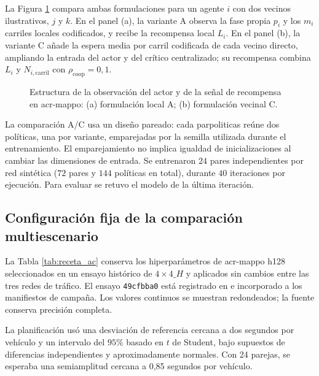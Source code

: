 La Figura \ref{fig:contraste_ac} compara ambas formulaciones para un agente $i$ con dos vecinos ilustrativos, $j$ y $k$. En el panel (a), la variante A observa la fase propia $p_i$ y los $m_i$ carriles locales codificados, y recibe la recompensa local $L_i$. En el panel (b), la variante C añade la espera media por carril codificada de cada vecino directo, ampliando la entrada del actor y del crítico centralizado; su recompensa combina $L_i$ y $N_{i,\mathrm{carril}}$ con $\rho_{\mathrm{coop}}=0{,}1$.

\begin{figure}[H]
\centering

\caption{Estructura de la observación del actor y de la señal de recompensa en \acrshort{acr-mappo}: (a) formulación local A; (b) formulación vecinal C.}
\label{fig:contraste_ac}
\end{figure}

La comparación A/C usa un diseño pareado: cada \gls{parpoliticas} reúne dos políticas, una por variante, emparejadas por la semilla utilizada durante el entrenamiento. El emparejamiento no implica igualdad de inicializaciones al cambiar las dimensiones de entrada. Se entrenaron $24$ pares independientes por red sintética ($72$ pares y $144$ políticas en total), durante $40$ iteraciones por ejecución. Para evaluar se retuvo el modelo de la última iteración.

\subsection{Configuración fija de la comparación multiescenario}
\label{subsec:receta_ac_apendice}

La Tabla \ref{tab:receta_ac} conserva los hiperparámetros de \acrshort{acr-mappo} h128 seleccionados en un ensayo histórico de $4\times4\_H$ y aplicados sin cambios entre las tres redes de tráfico. El ensayo \texttt{49cfbba0} está registrado en  e incorporado a los manifiestos de campaña. Los valores continuos se muestran redondeados; la fuente conserva precisión completa.

La planificación usó una desviación de referencia cercana a dos segundos por vehículo y un intervalo del $95\%$ basado en $t$ de Student, bajo supuestos de diferencias independientes y aproximadamente normales. Con 24 parejas, se esperaba una semiamplitud cercana a 0,85 segundos por vehículo.

